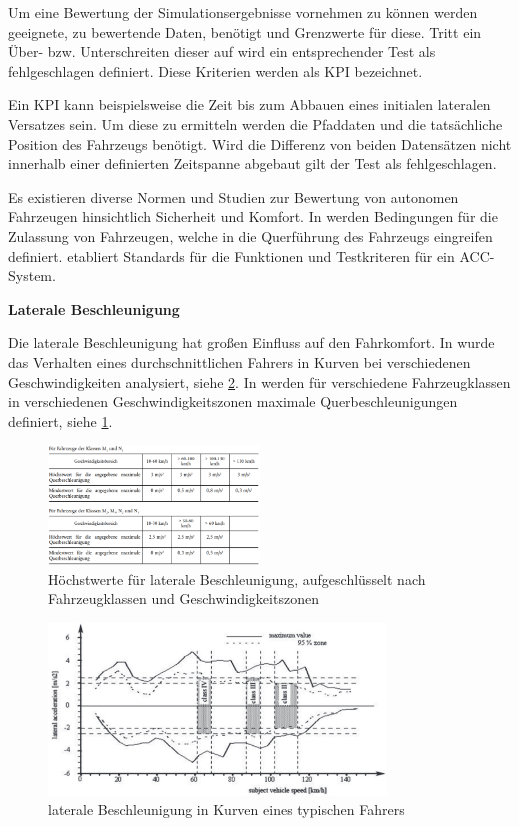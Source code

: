 Um eine Bewertung der Simulationsergebnisse vornehmen zu können werden geeignete, zu bewertende Daten, benötigt und Grenzwerte für diese. Tritt ein Über- bzw. Unterschreiten dieser auf wird ein entsprechender Test als fehlgeschlagen definiert. Diese Kriterien werden als KPI bezeichnet.

Ein KPI kann beispielsweise die Zeit bis zum Abbauen eines initialen lateralen Versatzes sein. Um diese zu ermitteln werden die Pfaddaten und die tatsächliche Position des Fahrzeugs benötigt. Wird die Differenz von beiden Datensätzen nicht innerhalb einer definierten Zeitspanne abgebaut gilt der Test als fehlgeschlagen.

Es existieren diverse Normen und Studien zur Bewertung von autonomen Fahrzeugen hinsichtlich Sicherheit und Komfort. In \cite{UNECE_R79} werden Bedingungen für die Zulassung von Fahrzeugen, welche in die Querführung des Fahrzeugs eingreifen definiert. \cite{ISO15622} etabliert Standards für die Funktionen und Testkriteren für ein ACC-System.

\bigskip\noindent\textbf{Laterale Beschleunigung}

\noindent Die laterale Beschleunigung hat großen Einfluss auf den Fahrkomfort. In \cite{ISO15622} wurde das Verhalten eines durchschnittlichen Fahrers in Kurven bei verschiedenen Geschwindigkeiten analysiert, siehe \ref{fig:lateral_acceleration}. In \cite{UNECE_R79} werden für verschiedene Fahrzeugklassen in verschiedenen Geschwindigkeitszonen maximale Querbeschleunigungen definiert, siehe \ref{fig:lateral_acceleration_unece}.
\begin{figure}
    \centering
    \includegraphics[width=0.5\textwidth]{figures/3_Implementierung/querbechleunigung_unece.png}
    \caption{Höchstwerte für laterale Beschleunigung, aufgeschlüsselt nach Fahrzeugklassen und Geschwindigkeitszonen \cite{UNECE_R79}}
    \label{fig:lateral_acceleration_unece}
\end{figure}
\begin{figure}
    \centering
    \includegraphics[width=0.8\textwidth]{figures/3_Implementierung/lateral_acceleration.png}
    \caption{laterale Beschleunigung in Kurven eines typischen Fahrers \cite{ISO15622}}
    \label{fig:lateral_acceleration}
\end{figure}

